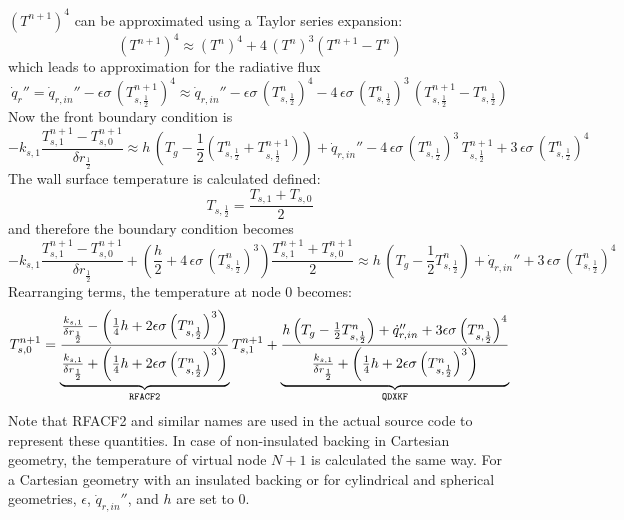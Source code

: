 $(T^{n+1})^4$ can be approximated using a Taylor series expansion:
\begin{equation}
\label{T_taylor}
(T^{n+1})^4 \approx (T^n)^4 + 4 \, (T^n)^3 (T^{n+1}-T^n)
\end{equation}
which leads to approximation for the radiative flux
\begin{equation}
\label{radi}
\dot{q}_r'' = \dot{q}_{r, in}'' - \epsilon \sigma \, \left( T_{s,\frac{1}{2}}^{n+1} \right)^4
  \approx \dot{q}_{r, in}'' - \epsilon \sigma \, \left( T_{s,\frac{1}{2}}^n \right)^4 - 4 \, \epsilon\sigma \, \left( T_{s,\frac{1}{2}}^n \right)^3 \, \left( T_{s,\frac{1}{2}}^{n+1}-T_{s,\frac{1}{2}}^n \right)
\end{equation}
Now the front boundary condition is
\begin{equation}
\label{bc_front_2}
  -k_{s,1} \frac{T_{s,1}^{n+1}-T_{s,0}^{n+1}}{\delta r_{\frac{1}{2}}}
  \approx h \, \left( T_g - \frac{1}{2} \left( T_{s,\frac{1}{2}}^n+T_{s,\frac{1}{2}}^{n+1} \right) \right) +
  \dot{q}_{r, in}'' - 4 \, \epsilon\sigma \, \left(T_{s,\frac{1}{2}}^n \right)^3 \, T_{s,\frac{1}{2}}^{n+1} + 3 \, \epsilon\sigma \, \left( T_{s,\frac{1}{2}}^n \right)^4
\end{equation}
The wall surface temperature is calculated defined:
\begin{equation}
\label{T_front}
  T_{s,\frac{1}{2}} = \frac{T_{s,1}+T_{s,0}}{2}
\end{equation}
and therefore the boundary condition becomes
\begin{equation}
\label{bc_front_4}
  -k_{s,1} \frac{T_{s,1}^{n+1}-T_{s,0}^{n+1}}{\delta r_{\frac{1}{2}}} + \left( \frac{h}{2} + 4 \, \epsilon\sigma \, \left( T_{s,\frac{1}{2}}^n \right)^3 \right) \frac{T_{s,1}^{n+1}+T_{s,0}^{n+1}}{2}
  \approx h\, \left( T_g - \frac{1}{2}T_{s,\frac{1}{2}}^n \right) +
  \dot{q}_{r, in}'' + 3 \, \epsilon\sigma \, \left( T_{s,\frac{1}{2}}^n \right)^4
\end{equation}
Rearranging terms, the temperature at node 0 becomes:
\begin{equation}
\label{T0}
  T_{s,0}^{n+1} = \underbrace{\frac{\frac{k_{s,1}}{\delta r_{\frac{1}{2}}}- \left(\frac{1}{4}h+2\epsilon \sigma \left(T_{s,\frac{1}{2}}^n\right)^3 \right)}{\frac{k_{s,1}}{\delta r_{\frac{1}{2}}} + \left(\frac{1}{4}h+2\epsilon \sigma \left( T_{s,\frac{1}{2}}^n\right)^3 \right)}}_{\tt\small RFACF2} T_{s,1}^{n+1} +
 \underbrace{\frac{h \left(T_g-\frac{1}{2}T_{s,\frac{1}{2}}^n\right)+\dot{q}_{r,in}''+3\epsilon \sigma \left( T_{s,\frac{1}{2}}^n\right)^4}{\frac{k_{s,1}}{\delta r_{\frac{1}{2}}}+\left(\frac{1}{4}h+2\epsilon \sigma \left( T_{s,\frac{1}{2}}^n\right)^3 \right)}}_{\tt\small QDXKF}
\end{equation}
Note that {\ct RFACF2} and similar names are used in the actual source code to represent these quantities.
In case of non-insulated backing in Cartesian geometry, the temperature of virtual node $N+1$ is calculated the same way.
For a Cartesian geometry with an insulated backing or for cylindrical and spherical geometries, $\epsilon$, $\dot{q}_{r,in}''$, and $h$ are set to 0.

